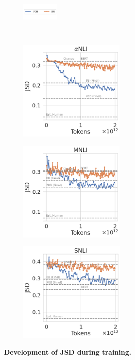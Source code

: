 \begin{figure}[t]
    \begin{subfigure}[b]{\textwidth}
        \includegraphics[width=0.2\textwidth]{figures/chaos_jsd_training_legend}
    \end{subfigure}\\
    \begin{subfigure}[b]{0.32\textwidth}
        \includegraphics[height=5cm]{figures/abductivenli_intermediate_jsd}
        \caption{}
    \end{subfigure}
    \begin{subfigure}[b]{0.32\textwidth}
        \includegraphics[height=5cm, trim=11mm 0 0 0, clip]{figures/mnli_matched_intermediate_jsd}
        \caption{}
    \end{subfigure}
    \begin{subfigure}[b]{0.32\textwidth}
        \includegraphics[height=5cm, trim=11mm 0 0 0, clip]{figures/snli_intermediate_jsd}
        \caption{}
    \end{subfigure}
    \caption{\textbf{Development of JSD during training.}}\label{fig:jsd_training}
\end{figure}

